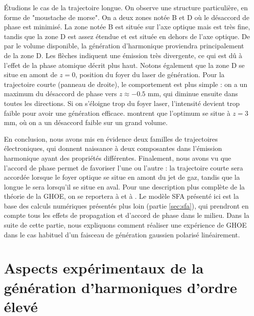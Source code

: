 \'Etudions le cas de la trajectoire longue. On observe une structure particulière, en forme de "moustache de morse". On a deux zones notée B et D où le désaccord de phase est minimisé. La zone notée B est située sur l'axe optique mais est très fine, tandis que la zone D est assez étendue et est située en dehors de l'axe optique. De par le volume disponible, la génération d'harmonique proviendra principalement de la zone D. Les flèches indiquent une émission très divergente, ce qui est dû à l'effet de la phase atomique décrit plus haut. Notons également que la zone D se situe en amont de $z=0$, position du foyer du laser de génération. Pour la trajectoire courte (panneau de droite), le comportement est plus simple : on a un maximum du désaccord de phase vers $z\approx-0.5$ mm, qui diminue ensuite dans toutes les directions. Si on s'éloigne trop du foyer laser, l'intensité devient trop faible pour avoir une génération efficace.  montrent que l'optimum se situe à $z=3$ mm, où on a un désaccord faible sur un grand volume. 

En conclusion, nous avons mis en évidence deux familles de trajectoires électroniques, qui donnent naissance à deux composantes dans l'émission harmonique ayant des propriétés différentes. Finalement, nous avons vu que l'accord de phase permet de favoriser l'une ou l'autre : la trajectoire courte sera accordée lorsque le foyer optique se situe en amont du jet de gaz, tandis que la longue le sera lorsqu'il se situe en aval. Pour une description plus complète de la théorie de la GHOE, on se reportera à  et à . Le modèle SFA présenté ici est la base des calculs numériques présentés plus loin (partie \ref{sec:sfa}), qui prendront en compte tous les effets de propagation et d'accord de phase dans le milieu. Dans la suite de cette partie, nous expliquons comment réaliser une expérience de GHOE dans le cas habituel d'un faisceau de génération gaussien polarisé linéairement.

\chapter{Aspects expérimentaux de la génération d'harmoniques d'ordre élevé}
\label{Sec:HHG_G}
